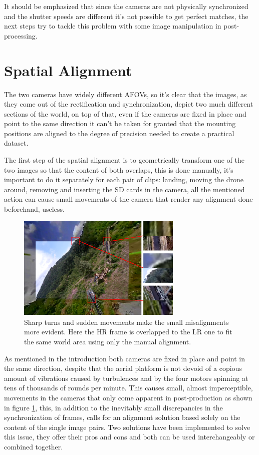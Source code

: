 It should be emphasized that since the cameras are not physically synchronized and the shutter speeds are different it's not possible to get perfect matches, the next steps try to tackle this problem with some image manipulation in post-processing.

\section{Spatial Alignment}
\label{sec:spatial_align}

The two cameras have widely different AFOVs, so it's clear that the images, as they come out of the rectification and synchronization, depict two much different sections of the world, on top of that, even if the cameras are fixed in place and point to the same direction it can't be taken for granted that the mounting positions are aligned to the degree of precision needed to create a practical dataset.

The first step of the spatial alignment is to geometrically transform one of the two images so that the content of both overlaps, this is done manually, it's important to do it separately for each pair of clips: landing, moving the drone around, removing and inserting the SD cards in the camera, all the mentioned action can cause small movements of the camera that render any alignment done beforehand, useless.

\begin{figure}[H]
  \centering
  \includegraphics[width=0.7\textwidth]{figures/HR_on_LR_M_err_highlight.png}
  \caption{Sharp turns and sudden movements make the small misalignments more evident. Here the HR frame is overlapped to the LR one to fit the same world area using only the manual alignment.}
  \label{img:align_err}
\end{figure}

As mentioned in the introduction both cameras are fixed in place and point in the same direction, despite that the aerial platform is not devoid of a copious amount of vibrations caused by turbulences and by the four motors spinning at tens of thousands of rounds per minute.
This causes small, almost imperceptible, movements in the cameras that only come apparent in post-production as shown in figure \ref{img:align_err}, this, in addition to the inevitably small discrepancies in the synchronization of frames, calls for an alignment solution based solely on the content of the single image pairs. Two solutions have been implemented to solve this issue, they offer their pros and cons and both can be used interchangeably or combined together.


